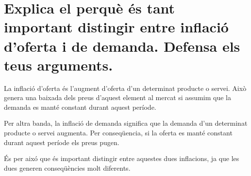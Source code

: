 \section{Explica el perquè és tant important distingir entre inflació d’oferta 
i de demanda. Defensa els teus arguments.}

La inflació d'oferta és l'augment d'oferta d'un determinat producte o servei.
Això genera una baixada dels preus d'aquest element al mercat si assumim que
la demanda es manté constant durant aquest període.

Per altra banda, la inflació de demanda significa que la demanda d'un 
determinat producte o servei augmenta. Per conseqüencia, si la oferta es
manté constant durant aquest període els preus pugen.

És per aixó que és important distingir entre aquestes dues inflacions, ja que
les dues generen conseqüències molt diferents.
